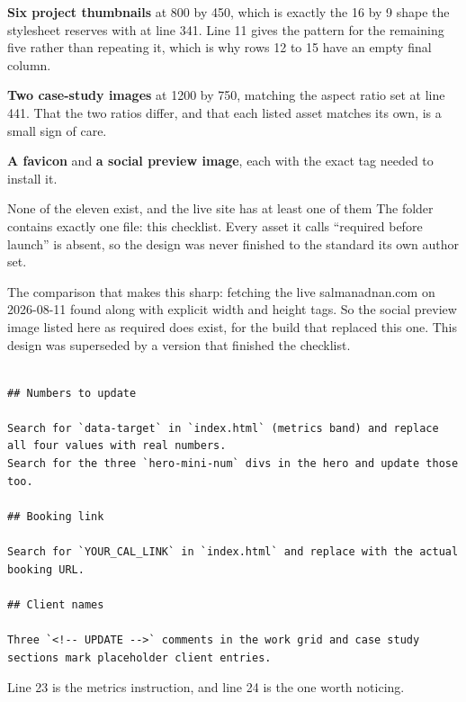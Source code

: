 \textbf{Six project thumbnails} at 800 by 450, which is exactly the 16 by 9 shape the
stylesheet reserves with  at line 341. Line 11 gives the pattern
for the remaining five rather than repeating it, which is why rows 12 to 15 have an
empty final column.

\textbf{Two case-study images} at 1200 by 750, matching the  aspect ratio
set at  line 441. That the two ratios differ, and that each listed
asset matches its own, is a small sign of care.

\textbf{A favicon} and \textbf{a social preview image}, each with the exact tag
needed to install it.

\begin{honest}{None of the eleven exist, and the live site has at least one of them}
The  folder contains exactly one file: this checklist. Every asset it
calls ``required before launch'' is absent, so the design was never finished to the
standard its own author set.

The comparison that makes this sharp: fetching the live salmanadnan.com on
2026-08-11 found  along with explicit width and height
tags. So the social preview image listed here as required does exist, for the build
that replaced this one. This design was superseded by a version that finished the
checklist.
\end{honest}

\begin{lstlisting}[firstnumber=20,caption={\file{ASSETS.md}, lines 20--32}]

## Numbers to update

Search for `data-target` in `index.html` (metrics band) and replace all four values with real numbers.
Search for the three `hero-mini-num` divs in the hero and update those too.

## Booking link

Search for `YOUR_CAL_LINK` in `index.html` and replace with the actual booking URL.

## Client names

Three `<!-- UPDATE -->` comments in the work grid and case study sections mark placeholder client entries.
\end{lstlisting}

Line 23 is the metrics instruction, and line 24 is the one worth noticing.

